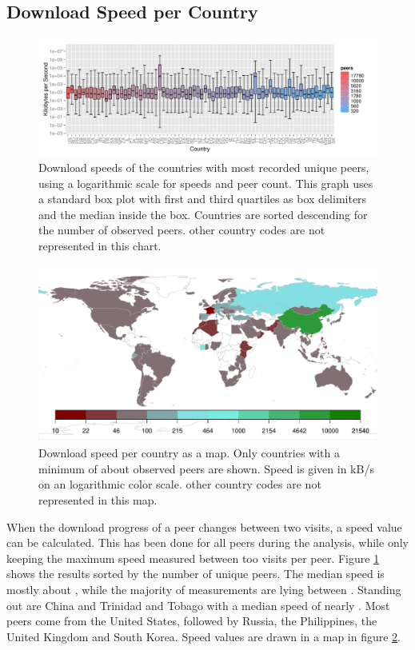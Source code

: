 \documentclass[10pt, a4paper, twoside=false, headsepline]{scrbook}
\renewcommand{\_}{\origunderscore\allowbreak}
\begin{document}
\subsection{Download Speed per Country}
\begin{figure}
\centering
\includegraphics[width=\textwidth]{../result/2015-08-30_20-combined_speed_plot}
\caption[Download speed per country as box plot]{Download speeds of the  countries with most recorded unique peers, using a logarithmic scale for speeds and peer count. This graph uses a standard box plot with first and third quartiles as box delimiters and the median inside the box. Countries are sorted descending for the number of observed peers.  other country codes are not represented in this chart.}
\label{speed-boxes}
\end{figure}

\begin{figure}
\centering
\includegraphics[width=\textwidth]{../result/2015-08-30_20-combined_speed_map}
\caption[Download speed per country as map]{Download speed per country as a map. Only countries with a minimum of about  observed peers are shown. Speed is given in kB/s on an logarithmic color scale.  other country codes are not represented in this map.}
\label{speed-map}
\end{figure}

When the download progress of a peer changes between two visits, a speed value can be calculated. This has been done for all peers during the analysis, while only keeping the maximum speed measured between too visits per peer. Figure \ref{speed-boxes} shows the results sorted by the number of unique peers. The median speed is mostly about , while the majority of measurements are lying between  . Standing out are China and Trinidad and Tobago with a median speed of nearly . Most peers come from the United States, followed by Russia, the Philippines, the United Kingdom and South Korea. Speed values are drawn in a map in figure \ref{speed-map}.
\end{document}
